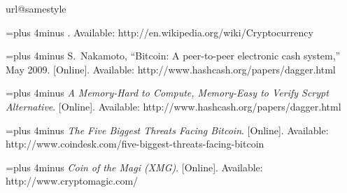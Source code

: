 \documentclass[aps,prl,reprint,showpacs,groupedaddress,letterpaper]{revtex4-1}
\begin{document}
\begin{thebibliography}{5}
\providecommand{\natexlab}[1]{#1}
\providecommand{\url}[1]{#1}
\csname url@samestyle\endcsname
\providecommand{\newblock}{\relax}
\providecommand{\bibinfo}[2]{#2}
\providecommand{\BIBentrySTDinterwordspacing}{\spaceskip=0pt\relax}
\providecommand{\BIBentryALTinterwordstretchfactor}{4}
\providecommand{\BIBentryALTinterwordspacing}{\spaceskip=\fontdimen2\font plus
\BIBentryALTinterwordstretchfactor\fontdimen3\font minus
  \fontdimen4\font\relax}
\providecommand{\BIBforeignlanguage}[2]{{\expandafter\ifx\csname l@#1\endcsname\relax
\typeout{** WARNING: IEEEtranN.bst: No hyphenation pattern has been}\typeout{** loaded for the language `#1'. Using the pattern for}\typeout{** the default language instead.}\else
\language=\csname l@#1\endcsname
\fi
#2}}
\providecommand{\BIBdecl}{\relax}
\BIBdecl

\BIBentryALTinterwordspacing
 [Online]. Available: \url{http://en.wikipedia.org/wiki/Cryptocurrency}
\BIBentrySTDinterwordspacing

\BIBentryALTinterwordspacing
S.~Nakamoto, ``Bitcoin: A peer-to-peer electronic cash system,'' May 2009.
  [Online]. Available: \url{http://www.hashcash.org/papers/dagger.html}
\BIBentrySTDinterwordspacing

\BIBentryALTinterwordspacing
\emph{A Memory-Hard to Compute, Memory-Easy to Verify Scrypt Alternative}.
  [Online]. Available: \url{http://www.hashcash.org/papers/dagger.html}
\BIBentrySTDinterwordspacing

\BIBentryALTinterwordspacing
\emph{The Five Biggest Threats Facing Bitcoin}. [Online]. Available:
  \url{http://www.coindesk.com/five-biggest-threats-facing-bitcoin}
\BIBentrySTDinterwordspacing

\BIBentryALTinterwordspacing
\emph{Coin of the Magi (XMG)}. [Online]. Available:
  \url{http://www.cryptomagic.com/}
\BIBentrySTDinterwordspacing

\end{thebibliography}
\end{document}

